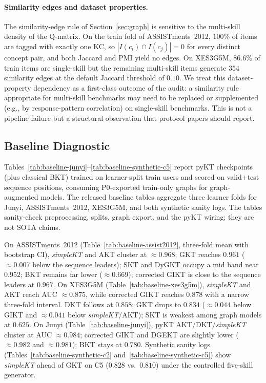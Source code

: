 \documentclass[pdflatex,sn-basic]{sn-jnl}
\begin{document}
\paragraph{Similarity edges and dataset properties.}
The similarity-edge rule of Section~\ref{sec:graph} is sensitive to the
multi-skill density of the Q-matrix. On the train fold of
ASSISTments~2012, $100\%$ of items are tagged with exactly one KC, so
$|I(c_i) \cap I(c_j)| = 0$ for every distinct concept pair, and both
Jaccard and PMI yield no edges. On XES3G5M, $86.6\%$ of train items are
single-skill but the remaining multi-skill items generate $354$
similarity edges at the default Jaccard threshold of $0.10$. We treat
this dataset-property dependency as a first-class outcome of the audit:
a similarity rule appropriate for multi-skill benchmarks may need to be
replaced or supplemented (e.g., by response-pattern correlation) on
single-skill benchmarks. This is not a pipeline failure but a structural
observation that protocol papers should report.
\subsection{Baseline Diagnostic}
\label{sec:exp-baseline}

Tables~\ref{tab:baseline-junyi}--\ref{tab:baseline-synthetic-c5} report
pyKT checkpoints (plus classical BKT) trained on learner-split train users and scored
on valid+test sequence positions, consuming P0-exported train-only graphs for
graph-augmented models. The released baseline tables aggregate three learner folds
for Junyi, ASSISTments~2012, XES3G5M, and both synthetic sanity logs.
The tables sanity-check preprocessing, splits, graph export, and the pyKT wiring;
they are not SOTA claims.

On ASSISTments~2012 (Table~\ref{tab:baseline-assist2012}, three-fold mean with bootstrap CI),
\textit{simpleKT} and AKT cluster at ${\approx}0.968$; GKT reaches $0.961$
(${\approx}0.007$ below the sequence leaders); SKT and DyGKT occupy a mid band near
$0.952$; BKT remains far lower (${\approx}0.669$); corrected GIKT is close to the
sequence leaders at $0.967$.
On XES3G5M (Table~\ref{tab:baseline-xes3g5m}),
\textit{simpleKT} and AKT reach AUC ${\approx}0.875$, while corrected GIKT reaches
$0.878$ with a narrow three-fold interval. DKT follows at $0.858$; GKT drops to $0.834$
(${\approx}0.044$ below GIKT and ${\approx}0.041$ below \textit{simpleKT}/AKT); SKT is
weakest among graph models at $0.625$.
On Junyi (Table~\ref{tab:baseline-junyi}), pyKT AKT/DKT/\textit{simpleKT} cluster
at AUC ${\approx}0.984$; corrected GIKT and DGEKT are slightly lower
(${\approx}0.982$ and ${\approx}0.981$); BKT stays at $0.780$.
Synthetic sanity logs (Tables~\ref{tab:baseline-synthetic-c2}
and~\ref{tab:baseline-synthetic-c5}) show \textit{simpleKT} ahead of GKT
on C5 ($0.828$ vs.\ $0.810$) under the controlled five-skill generator.
\end{document}
